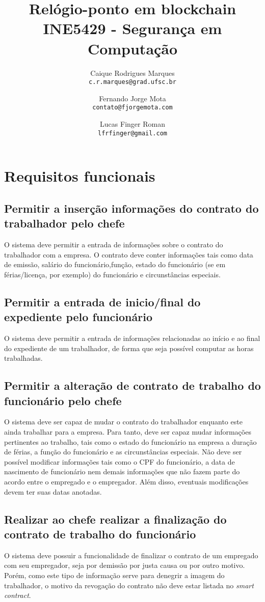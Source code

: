 \documentclass{article}
\title{\textbf{Relógio-ponto em blockchain \\
        \large INE5429 - Segurança em Computação}}
\author{
    Caique Rodrigues Marques \\
    {\texttt{c.r.marques@grad.ufsc.br}}
    \and
    Fernando Jorge Mota \\
    {\texttt{contato@fjorgemota.com}}
    \and
    Lucas Finger Roman \\
    {\texttt{lfrfinger@gmail.com}}
}
\date{}
\begin{document}
\maketitle
\tableofcontents{}
\section{Requisitos funcionais}

\subsection{Permitir a inserção informações do contrato do trabalhador pelo
chefe}
O sistema deve permitir a entrada de informações sobre o contrato do trabalhador
com a empresa. O contrato deve conter informações tais como data de emissão,
salário do funcionário,função, estado do funcionário (se em férias/licença, por
exemplo) do funcionário e circunstâncias especiais.

\subsection{Permitir a entrada de inicio/final do expediente pelo funcionário}
O sistema deve permitir a entrada de informações relacionadas ao início e ao
final do expediente de um trabalhador, de forma que seja possível computar as
horas trabalhadas.

\subsection{Permitir a alteração de contrato de trabalho do funcionário pelo
chefe}
O sistema deve ser capaz de mudar o contrato do trabalhador enquanto este ainda
trabalhar para a empresa. Para tanto, deve ser capaz mudar informações
pertinentes ao trabalho, tais como o estado do funcionário na empresa a duração
de férias, a função do funcionário e as circunstâncias especiais. Não deve ser
possível modificar informações tais como o CPF do funcionário, a data de
nascimento de funcionário nem demais informações que não fazem parte do acordo
entre o empregado e o empregador. Além disso, eventuais modificações devem ter
suas datas anotadas.

\subsection{Realizar ao chefe realizar a finalização do contrato de trabalho do
funcionário}
O sistema deve possuir a funcionalidade de finalizar o contrato de um empregado
com seu empregador, seja por demissão por justa causa ou por outro motivo.
Porém, como este tipo de informação serve para denegrir a imagem do
trabalhador, o motivo da revogação do contrato não deve estar listada no
\textit{smart contract}.
\end{document}
